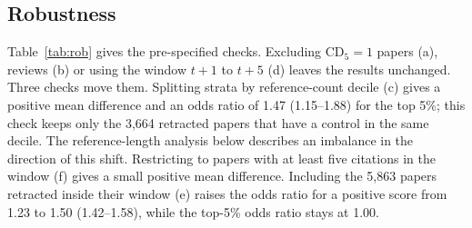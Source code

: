 \subsection{Robustness}
Table~\ref{tab:rob} gives the pre-specified checks. Excluding CD$_5 = 1$ papers (a), reviews (b) or using the window
$t+1$ to $t+5$ (d) leaves the results unchanged. Three checks move them. Splitting strata by reference-count decile
(c) gives a positive mean difference and an odds ratio of 1.47 (1.15--1.88) for the top 5\%; this check keeps only the
3,664 retracted papers that have a control in the same decile. The reference-length analysis below describes an
imbalance in the direction of this shift. Restricting to papers with at least five citations in the window (f) gives a
small positive mean difference. Including the 5,863 papers retracted inside their window (e) raises the odds ratio for
a positive score from 1.23 to 1.50 (1.42--1.58), while the top-5\% odds ratio stays at 1.00.

